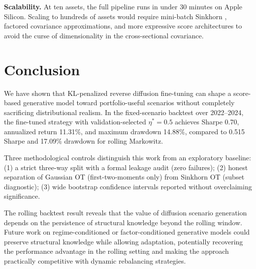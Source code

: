 \documentclass{article}
\begin{document}
\textbf{Scalability.} At ten assets, the full pipeline runs in under 30 minutes
on Apple Silicon. Scaling to hundreds of assets would require mini-batch Sinkhorn
\citep{fatras2021unbalanced}, factored covariance approximations, and more
expressive score architectures to avoid the curse of dimensionality in the
cross-sectional covariance.

\section{Conclusion}
\label{sec:conclusion}

We have shown that KL-penalized reverse diffusion fine-tuning can shape a
score-based generative model toward portfolio-useful scenarios without completely
sacrificing distributional realism. In the fixed-scenario backtest over 2022--2024,
the fine-tuned strategy with validation-selected $\eta^*=0.5$ achieves Sharpe 0.70,
annualized return 11.31\%, and maximum drawdown 14.88\%, compared to 0.515 Sharpe
and 17.09\% drawdown for rolling Markowitz.

Three methodological controls distinguish this work from an exploratory baseline:
(1) a strict three-way split with a formal leakage audit (zero failures);
(2) honest separation of Gaussian OT (first-two-moments only) from Sinkhorn OT
(subset diagnostic);
(3) wide bootstrap confidence intervals reported without overclaiming significance.

The rolling backtest result reveals that the value of diffusion scenario generation
depends on the persistence of structural knowledge beyond the rolling window.
Future work on regime-conditioned or factor-conditioned generative models could
preserve structural knowledge while allowing adaptation, potentially recovering
the performance advantage in the rolling setting and making the approach
practically competitive with dynamic rebalancing strategies.
\end{document}
